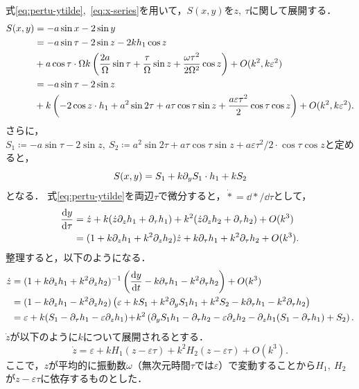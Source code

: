 \documentclass[../main]{subfiles}
\begin{document}
    式\eqref{eq:pertu-ytilde},\ \eqref{eq:x-series}を用いて，$S(x,y)$を$z,\ \tau$に関して展開する．
    \begin{align}
        S(x,y)&=-a\sin x-2\sin y\notag\\
        &=-a\sin\tau-2\sin z-2 kh_1\cos z\notag\\
        &+a\cos\tau\cdot \Omega k\left(\frac{2a}{\Omega}\sin\tau+\frac{\tau}{\Omega}\sin z+\frac{\omega \tau^2}{2\Omega^2}\cos z\right)+O(k^2,k\varepsilon^2)\notag\\
        &=-a\sin\tau-2\sin z\notag\\
        &+k\left(-2 \cos z\cdot h_1+a^2\sin 2\tau+a\tau\cos \tau\sin z+\frac{a\varepsilon \tau^2}{2}\cos \tau \cos z\right)+O(k^2,k\varepsilon^2).
    \end{align}
    さらに，$S_1\coloneqq-a\sin\tau-2\sin z,\ S_2\coloneqq a^2\sin 2\tau+a\tau\cos \tau\sin z+a\varepsilon \tau^2/2 \cdot\cos \tau \cos z$と定めると，
    \begin{equation}
        S(x,y)=S_1+k\partial_y S_1\cdot h_1+kS_2
    \end{equation}
    となる．
    式\eqref{eq:pertu-ytilde}を両辺$\tau$で微分すると，$\dot{\ast}=\dd{\ast}/\dd{\tau}$として，
    \begin{align}
        \dv{y}{\tau}&=\dot{z}+k(\dot{z}\partial_zh_1+\partial_\tau h_1)+k^2(\dot{z}\partial_zh_2+\partial_\tau h_2)+O(k^3)\notag\\
        &=(1+k\partial_zh_1+k^2\partial_zh_2)\dot{z}+k\partial_\tau h_1+k^2\partial_\tau h_2+O(k^3).
    \end{align}
    整理すると，以下のようになる．
    \begin{align}
        \dot{z}&=(1+k\partial_zh_1+k^2\partial_zh_2)^{-1}\left( \dv{y}{t}-k\partial_\tau h_1-k^2\partial_\tau h_2 \right)+O(k^3)\notag\\
        &=(1-k\partial_zh_1-k^2\partial_zh_2)\left(\varepsilon+kS_1+k^2 \partial_y S_1h_1+k^2S_2-k\partial_\tau h_1-k^2\partial_\tau h_2 \right)\notag\\
        &=\varepsilon+k(S_1-\partial_\tau h_1-\varepsilon\partial_zh_1)\!+\!k^2\left(\partial_y S_1h_1 -\partial_\tau h_2-\varepsilon\partial_zh_2 -\partial_zh_1(S_1-\partial_\tau h_1)+S_2\right).
    \end{align}
    $\dot{z}$が以下のように$k$について展開されるとする．
    \begin{equation}
        \dot{z}=\varepsilon+kH_1(z-\varepsilon \tau)+k^2H_2(z-\varepsilon \tau)+O(k^3).
    \end{equation}
    ここで，$z$が平均的に振動数$\omega$（無次元時間$\tau$では$\varepsilon$）で変動することから$H_1,\ H_2$が$z-\varepsilon \tau$に依存するものとした．
    
\end{document}
